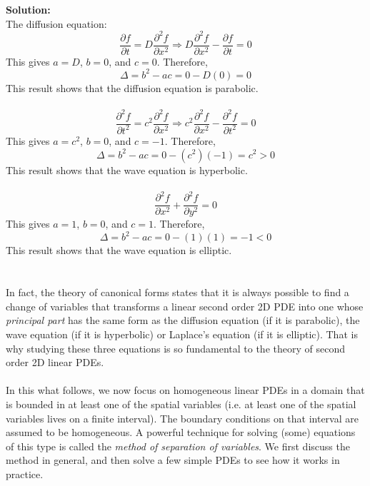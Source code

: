 {\color{red} {\bf Solution:}\\
The diffusion equation:\\
\begin{equation*}
    \frac{\partial f}{\partial t} = D \frac{\partial ^2 f}{\partial x^2} \Rightarrow D \frac{\partial ^2 f}{\partial x^2} - \frac{\partial f}{\partial t} = 0
\end{equation*}
This gives $a=D$, $b=0$, and $c=0$. Therefore,
\begin{equation*}
    \Delta = b^2 - ac = 0 - D(0) = 0
\end{equation*}
This result shows that the diffusion equation is parabolic.\\

\\
\begin{equation*}
    \frac{\partial^2 f}{\partial t^2} = c^2 \frac{\partial ^2 f}{\partial x^2} \Rightarrow c^2 \frac{\partial ^2 f}{\partial x^2} - \frac{\partial^2 f}{\partial t^2} = 0
\end{equation*}
This gives $a=c^2$, $b=0$, and $c=-1$. Therefore,
\begin{equation*}
    \Delta = b^2 - ac = 0 - (c^2)(-1) = c^2 > 0
\end{equation*}
This result shows that the wave equation is hyperbolic.\\

\\
\begin{equation*}
    \frac{\partial^2 f}{\partial x^2} + \frac{\partial ^2 f}{\partial y^2} = 0 
\end{equation*}
This gives $a=1$, $b=0$, and $c=1$. Therefore,
\begin{equation*}
    \Delta = b^2 - ac = 0 - (1)(1) = -1 < 0
\end{equation*}
This result shows that the wave equation is elliptic.\\
}
\\
\\
In fact, the theory of canonical forms states that it is always possible to find a change of variables that transforms a linear second order 2D PDE into one whose {\it principal part} has the same form as the diffusion equation (if it is parabolic), the wave equation (if it is hyperbolic) or Laplace's equation (if it is elliptic). That is why studying these three equations is so fundamental to the theory of second order 2D linear PDEs. 
\\
\\
In this what follows, we now focus on homogeneous linear PDEs in a domain that is bounded in at least one of the spatial variables (i.e. at least one of the spatial variables lives on a finite interval). The boundary conditions on that interval are assumed to be homogeneous. A powerful technique for solving (some) equations of this type is called the {\it method of separation of variables}. We first discuss the method in general, and then solve a few simple PDEs to see how it works in practice.

